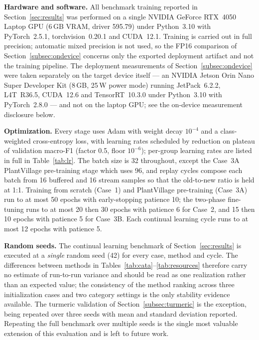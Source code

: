 \documentclass[journal]{IEEEtran}
\begin{document}
\textbf{Hardware and software.} All benchmark training reported in
Section~\ref{sec:results} was performed on a single NVIDIA GeForce RTX~4050 Laptop
GPU (6\,GB VRAM, driver 595.79) under Python~3.10 with PyTorch~2.5.1,
torchvision~0.20.1 and CUDA~12.1. Training is carried out in full precision;
automatic mixed precision is not used, so the FP16 comparison of
Section~\ref{subsec:ondevice} concerns only the exported deployment artifact and not
the training pipeline. The deployment measurements of
Section~\ref{subsec:ondevice} were taken separately on the target device itself ---
an NVIDIA Jetson Orin Nano Super Developer Kit (8\,GB, 25\,W power mode) running
JetPack~6.2.2, L4T~R36.5, CUDA~12.6 and TensorRT~10.3.0 under Python~3.10 with
PyTorch~2.8.0 --- and not on the laptop GPU; see the on-device measurement
disclosure below.

\textbf{Optimization.} Every stage uses Adam with weight decay $10^{-4}$ and a
class-weighted cross-entropy loss, with learning rates scheduled by reduction on
plateau of validation macro-F1 (factor 0.5, floor $10^{-6}$); per-group learning
rates are listed in full in Table~\ref{tab:lr}. The batch size is 32 throughout,
except the Case~3A PlantVillage pre-training stage which uses 96, and replay cycles
compose each batch from 16 buffered and 16 stream samples so that the old-to-new
ratio is held at 1:1. Training from scratch (Case~1) and PlantVillage pre-training
(Case~3A) run to at most 50 epochs with early-stopping patience 10; the two-phase
fine-tuning runs to at most 20 then 30 epochs with patience 6 for Case~2, and 15
then 10 epochs with patience 5 for Case~3B. Each continual learning cycle runs to at
most 12 epochs with patience 5.

\textbf{Random seeds.} The continual learning benchmark of
Section~\ref{sec:results} is executed at a \emph{single} random seed (42) for every
case, method and cycle. The differences between methods in
Tables~\ref{tab:cata}--\ref{tab:resources} therefore carry no estimate of
run-to-run variance and should be read as one realization rather than an expected
value; the consistency of the method ranking across three initialization cases and
two category settings is the only stability evidence available. The turmeric
validation of Section~\ref{subsec:turmeric} is the exception, being repeated over
three seeds with mean and standard deviation reported. Repeating the full benchmark
over multiple seeds is the single most valuable extension of this evaluation and is
left to future work.
\end{document}
